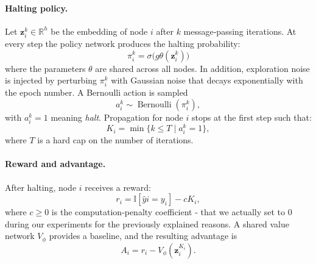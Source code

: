\documentclass{gdl}
\begin{document}
\paragraph{Halting policy.}
Let $\mathbf{z}_i^{k}\in\mathbb{R}^h$ be the embedding of node $i$ after $k$ message‑passing iterations. At every step the policy network produces the halting probability:
\begin{equation}
\pi_i^{k}=\sigma\bigl(g{\theta}(\mathbf{z}_i^{k})\bigr)
\end{equation}
where the parameters $\theta$ are shared across all nodes. In addition, exploration noise is injected by perturbing $\pi_i^{k}$ with Gaussian noise that decays exponentially with the epoch number. A Bernoulli action is sampled
\begin{equation}
a_i^{k} \sim \operatorname{Bernoulli}(\pi_i^{k}) ,
\end{equation}
with $a_i^{k}=1$ meaning \emph{halt}. Propagation for node $i$ stops at the first step such that:
\begin{equation}
K_i = \min\{ k \le T \mid a_i^k = 1 \},
\end{equation}
where $T$ is a hard cap on the number of iterations.

\paragraph{Reward and advantage.}
After halting, node $i$ receives a reward:
\begin{equation}
r_i = \mathbb{I}[\hat{y}i = y_i] - cK_i ,
\end{equation}
where $c\ge 0$ is the computation‑penalty coefficient - that we actually set to 0 during our experiments for the previously explained reasons. A shared value network $V_{\phi}$ provides a baseline, and the resulting advantage is
\begin{equation}
A_i = r_i - V_{\phi}(\mathbf{z}_i^{K_i}).
\end{equation}
\end{document}
